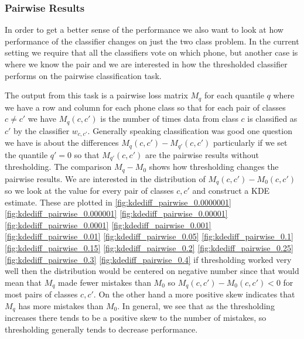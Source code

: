 \documentclass{article}
\begin{document}
\subsubsection{Pairwise Results}
\label{sec:pairwise-results}
In order to get a better sense
of the performance we also want to look at how performance of the
classifier changes on just the two class problem.  In the current
setting we require that all the classifiers vote on which phone,
but another case is where we know the pair and we are interested
in how the thresholded classifier performs on the pairwise classification task.

The output from this task is a pairwise loss matrix $M_q$ for each
quantile $q$ where we have
a row and column for each phone class so that for each pair
of classes $c\neq c'$ we have $M_q(c,c')$ is the number of times
data from class $c$ is classified as $c'$ by the classifier $w_{c,c'}$.  Generally speaking classification was good one question we have
is about the differences  $M_q(c,c') - M_{q'}(c,c')$ particularly
if we set the quantile $q'=0$ so that $M_{q'}(c,c')$ are the
pairwise results without thresholding.  The comparison
$M_q - M_0$ shows how thresholding changes the pairwise results.
We are interested in the distribution of $M_q(c,c')-M_0(c,c')$
so we look at the value for every pair of classes $c,c'$ and construct
a KDE estimate.  These are plotted in
\autoref{fig:kdediff_pairwise_0.0000001}
\autoref{fig:kdediff_pairwise_0.000001}
\autoref{fig:kdediff_pairwise_0.00001}
\autoref{fig:kdediff_pairwise_0.0001}
\autoref{fig:kdediff_pairwise_0.001}
\autoref{fig:kdediff_pairwise_0.01}
\autoref{fig:kdediff_pairwise_0.05}
\autoref{fig:kdediff_pairwise_0.1}
\autoref{fig:kdediff_pairwise_0.15}
\autoref{fig:kdediff_pairwise_0.2}
\autoref{fig:kdediff_pairwise_0.25}
\autoref{fig:kdediff_pairwise_0.3}
\autoref{fig:kdediff_pairwise_0.4}
if thresholding worked very well then the distribution would be
centered on negative number since that would mean that $M_q$
made fewer mistakes than $M_0$ so $M_q(c,c')-M_0(c,c')<0$ for most
pairs of classes $c,c'$.  On the other hand a more positive skew
indicates that $M_q$ has more mistakes than $M_0$.  In general, we
see that as the thresholding increases there tends to be a positive
skew to the number of mistakes, so thresholding generally tends to
decrease performance.
\end{document}
